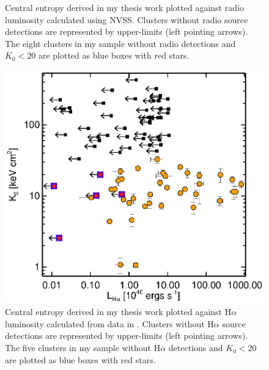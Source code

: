 \documentclass[11pt]{article}
\begin{document}
\begin{figure}[t]
\begin{minipage}[t]{0.5\linewidth}
        \caption{\small Central entropy derived in my thesis work
        plotted against radio luminosity calculated using
        NVSS. Clusters without radio source detections are represented
	by upper-limits (left pointing arrows). The eight clusters in my
	sample without radio detections and $K_0 < 20$ are plotted as blue
	boxes with red stars.}
        \label{fig:radk0}
    \end{minipage}
    \hspace{0.1in}
    \begin{minipage}[t]{0.5\linewidth}
        \centering
        \includegraphics*[width=\textwidth, trim=28mm 8mm 30mm 10mm, clip]{ha_k0}
        \caption{\small Central entropy derived in my thesis work
        plotted against H$\alpha$ luminosity calculated from data in
	\cite{1999MNRAS.306..857C}. Clusters without H$\alpha$ source
	detections are represented by upper-limits (left pointing arrows). The
	five clusters in my sample without H$\alpha$ detections and $K_0 < 20$
	are plotted as blue boxes with red stars.}
        \label{fig:hak0}
    \end{minipage}
    \hspace{0.1in}
    \begin{minipage}[t]{0.5\linewidth}
        \centering

\end{minipage}
\end{figure}
\end{document}
